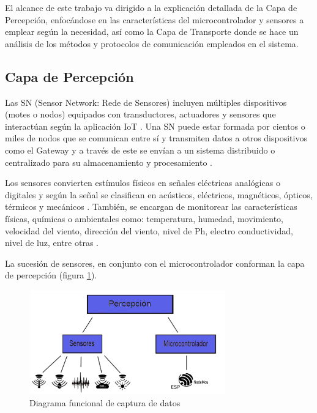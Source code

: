     El alcance de este trabajo va dirigido a la explicación detallada de la Capa de Percepción, enfocándose en las características del microcontrolador y sensores a emplear según la necesidad, así como la Capa de Transporte donde se hace un análisis de los métodos y protocolos de comunicación empleados en el sistema.

    \subsection{Capa de Percepción}\label{subsec:capa_percepcion}

    Las SN (Sensor Network: Rede de Sensores) incluyen múltiples dispositivos (motes o nodos) equipados con transductores, actuadores y sensores que interactúan según la aplicación IoT \cite{hernandez}.
    Una SN puede estar formada por cientos o miles de nodos que se comunican entre sí y transmiten datos a otros dispositivos como el Gateway y a través de este se envían a un sistema distribuido o centralizado
    para su almacenamiento y procesamiento \cite{hernandez} \cite{lee}.

    Los sensores convierten estímulos físicos en señales eléctricas analógicas o digitales y según la señal se clasifican en acústicos, eléctricos, magnéticos, ópticos, térmicos y mecánicos \cite{hernandez}.
    También, se encargan de monitorear las características físicas, químicas o ambientales como: temperatura, humedad, movimiento, velocidad del viento, dirección del viento, nivel de Ph, electro conductividad, nivel de luz, entre otras \cite{lee}.

    La sucesión de sensores, en conjunto con el microcontrolador conforman la capa de percepción (figura \ref{imag:capa_percepcion}). 

    \begin{figure}[H]
        \centering
        \includegraphics[width=8.5cm, height=4.5cm]{imagenes/perception_image.jpg}
        \caption{Diagrama funcional de captura de datos}
        \label{imag:capa_percepcion}
    \end{figure}

